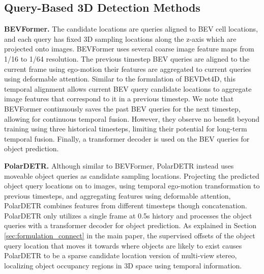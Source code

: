 \documentclass[runningheads, hyperfootnotes=false]{article}
\begin{document}
\subsection{Query-Based 3D Detection Methods}
\noindent\textbf{BEVFormer.} The candidate locations are queries aligned to BEV cell locations, and each query has fixed 3D sampling locations along the z-axis which are projected onto images. BEVFormer uses several coarse image feature maps from 1/16 to 1/64 resolution. The previous timestep BEV queries are aligned to the current frame using ego-motion their features are aggregated to current queries using deformable attention. Similar to the formulation of BEVDet4D, this temporal alignment allows current BEV query candidate locations to aggregate image features that correspond to it in a previous timestep. We note that BEVFormer continuously saves the past BEV queries for the next timestep, allowing for continuous temporal fusion. However, they observe no benefit beyond training using three historical timesteps, limiting their potential for long-term temporal fusion. Finally, a transformer decoder is used on the BEV queries for object prediction.

\noindent\textbf{PolarDETR.} Although similar to BEVFormer, PolarDETR instead uses moveable object queries as candidate sampling locations. Projecting the predicted object query locations on to images, using temporal ego-motion transformation to previous timesteps, and aggregating features using deformable attention, PolarDETR combines features from different timesteps though concatenation. PolarDETR only utilizes a single frame at 0.5s history and processes the object queries with a transformer decoder for object prediction. As explained in Section \ref{sec:formulation_connect} in the main paper, the supervised offsets of the object query location that moves it towards where objects are likely to exist causes PolarDETR to be a sparse candidate location version of multi-view stereo, localizing object occupancy regions in 3D space using temporal information.
\end{document}
